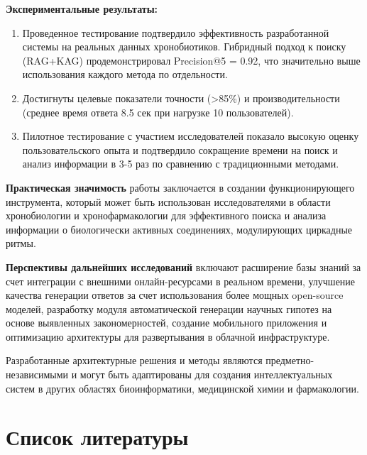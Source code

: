 \documentclass[a4paper,14pt]{extarticle}
\begin{document}
	\textbf{Экспериментальные результаты:}
	\begin{enumerate}
		\item Проведенное тестирование подтвердило эффективность разработанной системы на реальных данных хронобиотиков. Гибридный подход к поиску (RAG+KAG) продемонстрировал Precision@5 = 0.92, что значительно выше использования каждого метода по отдельности.
		\item Достигнуты целевые показатели точности (>85\%) и производительности (среднее время ответа 8.5 сек при нагрузке 10 пользователей).
		\item Пилотное тестирование с участием исследователей показало высокую оценку пользовательского опыта и подтвердило сокращение времени на поиск и анализ информации в 3-5 раз по сравнению с традиционными методами.
	\end{enumerate}
	
	\textbf{Практическая значимость} работы заключается в создании функционирующего инструмента, который может быть использован исследователями в области хронобиологии и хронофармакологии для эффективного поиска и анализа информации о биологически активных соединениях, модулирующих циркадные ритмы.
	
	\textbf{Перспективы дальнейших исследований} включают расширение базы знаний за счет интеграции с внешними онлайн-ресурсами в реальном времени, улучшение качества генерации ответов за счет использования более мощных open-source моделей, разработку модуля автоматической генерации научных гипотез на основе выявленных закономерностей, создание мобильного приложения и оптимизацию архитектуры для развертывания в облачной инфраструктуре.
	
	Разработанные архитектурные решения и методы являются предметно-независимыми и могут быть адаптированы для создания интеллектуальных систем в других областях биоинформатики, медицинской химии и фармакологии.
	
	\newpage
	
	\section*{Список литературы}
	
\end{document}
